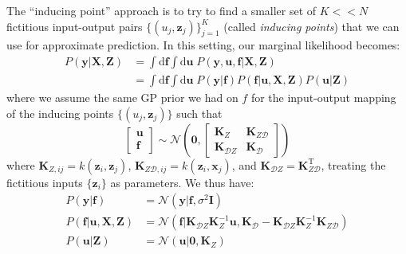 \documentclass[a4paper]{article}
\begin{document}
The ``inducing point'' approach is to try to find a smaller set of $K << N$ fictitious input-output pairs $\{(u_j,\mathbf{z}_j)\}_{j = 1}^K$ (called \emph{inducing points}) that we can use for approximate prediction. In this setting, our marginal likelihood becomes:
\begin{align*}
P(\mathbf{y}|\mathbf{X,Z}) &= \int \textrm{d}\mathbf{f} \int \textrm{d}\mathbf{u} \; P(\mathbf{y,u,f}|\mathbf{X,Z}) \\
&= \int \textrm{d}\mathbf{f} \int \textrm{d}\mathbf{u} \; P(\mathbf{y}|\mathbf{f}) P(\mathbf{f}|\mathbf{u,X,Z}) P(\mathbf{u}|\mathbf{Z})
\end{align*}
where we assume the same GP prior we had on $f$ for the input-output mapping of the inducing points $\{(u_j,\mathbf{z}_j)\}$ such that 
\[ \begin{bmatrix} \mathbf{u} \\ \mathbf{f} \end{bmatrix} \sim \mathcal{N}\left(\mathbf{0},\begin{bmatrix} \mathbf{K}_Z & \mathbf{K}_{Z\mathcal{D}} \\ \mathbf{K}_{\mathcal{D}Z} & \mathbf{K}_\mathcal{D} \end{bmatrix} \right) \]
where $\mathbf{K}_{Z,ij} = k(\mathbf{z}_i,\mathbf{z}_j)$, $\mathbf{K}_{Z\mathcal{D},ij} = k(\mathbf{z}_i,\mathbf{x}_j)$, and $\mathbf{K}_{\mathcal{D}Z} = \mathbf{K}_{Z\mathcal{D}}^\textrm{T}$, treating the fictitious inputs $\{\mathbf{z}_i\}$ as parameters. We thus have:
\begin{align*}
P(\mathbf{y}|\mathbf{f}) &= \mathcal{N}(\mathbf{y}|\mathbf{f},\sigma^2 \mathbf{I}) \\
P(\mathbf{f}|\mathbf{u,X,Z}) &= \mathcal{N}\left(\mathbf{f}|\mathbf{K}_{\mathcal{D}Z}\mathbf{K}_Z^{-1}\mathbf{u}, \mathbf{K}_\mathcal{D} - \mathbf{K}_{\mathcal{D}Z}\mathbf{K}_Z^{-1}\mathbf{K}_{Z\mathcal{D}} \right) \\
P(\mathbf{u}|\mathbf{Z}) &= \mathcal{N}(\mathbf{u}|\mathbf{0},\mathbf{K}_Z)
\end{align*}
\end{document}
